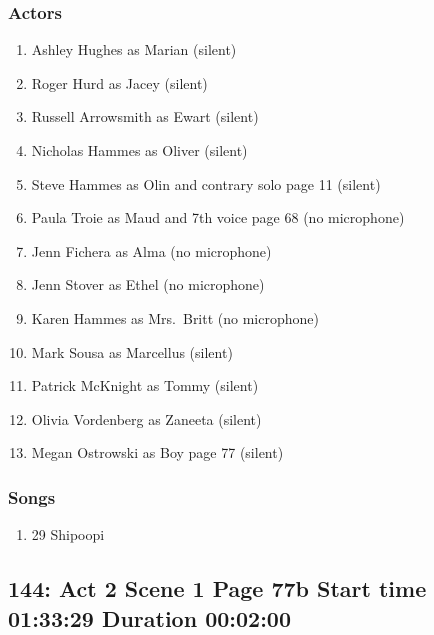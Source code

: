 \subsubsection{Actors}
\begin{enumerate}
\item Ashley Hughes as Marian (silent)
\item Roger Hurd as Jacey (silent)
\item Russell Arrowsmith as Ewart (silent)
\item Nicholas Hammes as Oliver (silent)
\item Steve Hammes as Olin and contrary solo page 11 (silent)
\item Paula Troie as Maud and 7th voice page 68 (no microphone)
\item Jenn Fichera as Alma (no microphone)
\item Jenn Stover as Ethel (no microphone)
\item Karen Hammes as Mrs.~Britt (no microphone)
\item Mark Sousa as Marcellus (silent)
\item Patrick McKnight as Tommy (silent)
\item Olivia Vordenberg as Zaneeta (silent)
\item Megan Ostrowski as Boy page 77 (silent)
\end{enumerate}

\subsubsection{Songs}
\begin{enumerate}
\item 29 Shipoopi
\end{enumerate}
\subsection{144: Act 2 Scene 1 Page 77b Start time 01:33:29 Duration 00:02:00}

